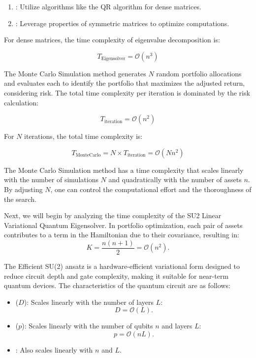 \documentclass[%
 reprint,
 amsmath,amssymb,
 aps,
]{revtex4-2}
\begin{document}
\begin{enumerate}
    \item {}: Utilize algorithms like the QR algorithm for dense matrices.
    \item {}: Leverage properties of symmetric matrices to optimize computations.
\end{enumerate}

For dense matrices, the time complexity of eigenvalue decomposition is:

\begin{equation}
T_{\text{Eigensolver}} = \mathcal{O}(n^3)
\end{equation}

The Monte Carlo Simulation method generates $N$ random portfolio allocations and evaluates each to identify the portfolio that maximizes the adjusted return, considering risk. The total time complexity per iteration is dominated by the risk calculation:

\begin{equation}
T_{\text{iteration}} = \mathcal{O}(n^2)
\end{equation}

For $N$ iterations, the total time complexity is:

\begin{equation}
T_{\text{MonteCarlo}} = N \times T_{\text{iteration}} = \mathcal{O}(N n^2)
\end{equation}

The Monte Carlo Simulation method has a time complexity that scales linearly with the number of simulations $N$ and quadratically with the number of assets $n$. By adjusting $N$, one can control the computational effort and the thoroughness of the search.

Next, we will begin by analyzing the time complexity of the SU2 Linear Variational Quantum Eigensolver. In portfolio optimization, each pair of assets contributes to a term in the Hamiltonian due to their covariance, resulting in:
\begin{equation}
K = \frac{n(n+1)}{2} = \mathcal{O}(n^2).
\end{equation}

The Efficient SU(2) ansatz is a hardware-efficient variational form designed to reduce circuit depth and gate complexity, making it suitable for near-term quantum devices. The characteristics of the quantum circuit are as follows:
\begin{itemize}
    \item {} ($D$): Scales linearly with the number of layers $L$:
    \begin{equation}
    D = \mathcal{O}(L).
    \end{equation}
    \item {} ($p$): Scales linearly with the number of qubits $n$ and layers $L$:
    \begin{equation}
    p = \mathcal{O}(nL).
    \end{equation}
    \item {}: Also scales linearly with $n$ and $L$.
\end{itemize}
\end{document}
